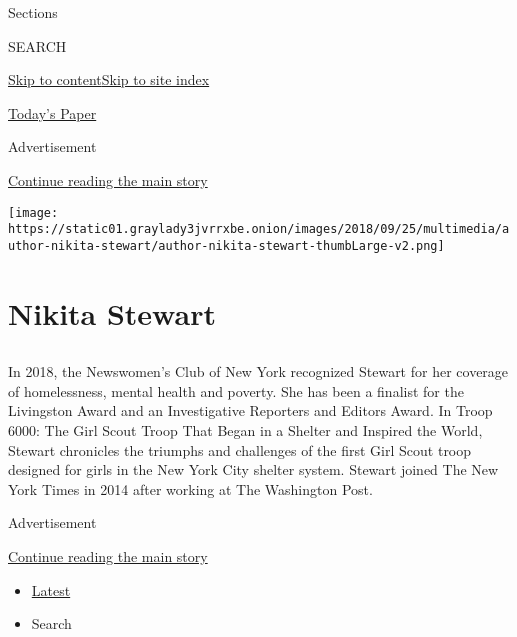 Sections

SEARCH

\protect\hyperlink{site-content}{Skip to
content}\protect\hyperlink{site-index}{Skip to site index}

\href{https://myaccount.nytimes3xbfgragh.onion/auth/login?response_type=cookie\&client_id=vi}{}

\href{https://www.nytimes3xbfgragh.onion/section/todayspaper}{Today's
Paper}

Advertisement

\protect\hyperlink{after-top}{Continue reading the main story}

\texttt{[image: https://static01.graylady3jvrrxbe.onion/images/2018/09/25/multimedia/author-nikita-stewart/author-nikita-stewart-thumbLarge-v2.png]}

\hypertarget{nikita-stewart}{%
\section{Nikita Stewart}\label{nikita-stewart}}

\subsection{}

In 2018, the Newswomen's Club of New York recognized Stewart for her
coverage of homelessness, mental health and poverty. She has been a
finalist for the Livingston Award and an Investigative Reporters and
Editors Award. In Troop 6000: The Girl Scout Troop That Began in a
Shelter and Inspired the World, Stewart chronicles the triumphs and
challenges of the first Girl Scout troop designed for girls in the New
York City shelter system. Stewart joined The New York Times in 2014
after working at The Washington Post.~

Advertisement

\protect\hyperlink{after-mid1}{Continue reading the main story}

\begin{itemize}
\tightlist
\item
  \protect\hyperlink{stream-panel}{Latest}
\item
  Search
\end{itemize}

